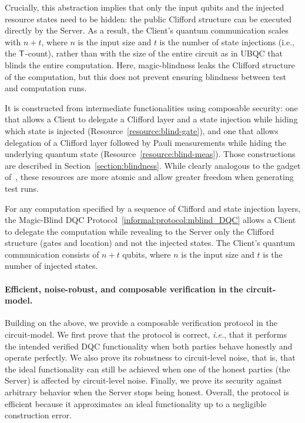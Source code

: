 Crucially, this abstraction implies that only the input qubits and the injected resource states need to be hidden: the public Clifford structure can be executed directly by the Server. As a result, the Client’s quantum communication scales with $n+t$, where $n$ is the input size and $t$ is the number of state injections (i.e., the $\mathsf{T}$-count), rather than with the size of the entire circuit as in UBQC that blinds the entire computation. Here, magic-blindness leaks the Clifford structure of the computation, but this does not prevent ensuring blindness between test and computation runs.

It is constructed from intermediate functionalities using composable security: one that allows a Client to delegate a Clifford layer and a state injection while hiding which state is injected (Resource~\ref{resource:blind-gate}), and one that allows delegation of a Clifford layer followed by Pauli measurements while hiding the underlying quantum state (Resource~\ref{resource:blind-meas}). Those constructions are described in Section~\ref{section:blindness}. While clearly analogous to the gadget of~\cite{B18how}, these resources are more atomic and allow greater freedom when generating test runs.

\setcounter{theorem}{4}
\begin{theorem}
    For any computation specified by a sequence of Clifford and state injection layers, the Magic-Blind DQC Protocol~\ref{informal:protocol:mblind_DQC} allows a Client to delegate the computation while revealing to the Server only the Clifford structure (gates and location) and not the injected states.
    The Client’s quantum communication consists of $n+t$ qubits, where $n$ is the input size and $t$ is the number of injected states.
    \end{theorem}

\paragraph{Efficient, noise-robust, and composable verification in the circuit-model.}
Building on the above, we provide a composable verification protocol in the circuit-model.
We first prove that the protocol is correct, \textit{i.e.}, that it performs the intended verified DQC functionality when both parties behave honestly and operate perfectly. We also prove its robustness to circuit-level noise, that is, that the ideal functionality can still be achieved when one of the honest parties (the Server) is affected by circuit-level noise. Finally, we prove its security against arbitrary behavior when the Server stops being honest. Overall, the protocol is efficient because it approximates an ideal functionality up to a negligible construction error.

